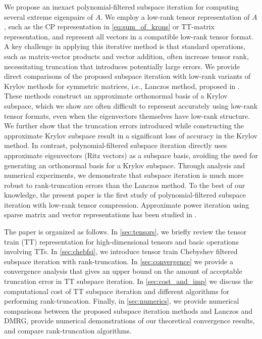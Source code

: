 \documentclass[10pt,preprint]{elsarticle}
\begin{document}
We propose an inexact polynomial-filtered subspace iteration for computing several extreme eigenpairs of $A$. We employ a low-rank tensor representation of $A$, such as the CP representation in \eqref{eq:sum_of_krons} or TT-matrix representation, and represent all vectors in a compatible low-rank tensor format. A key challenge in applying this iterative method is that standard operations, such as matrix-vector products and vector addition, often increase tensor rank, necessitating truncation that introduces potentially large errors. 
%
We provide direct comparisons of the proposed subspace iteration with low-rank variants of Krylov methods for symmetric matrices, i.e., Lanczos method, proposed in \cite{MPS_Lanczos,kressner2010krylov,kressner2011,Palitta2021}. These methods construct an approximate orthonormal basis of a Krylov subspace, which we show are often difficult to represent accurately using low-rank tensor formats, even when the eigenvectors themselves have low-rank structure. We further show that the truncation errors introduced while constructing the approximate Krylov subspace result in a significant loss of accuracy in the Krylov method. In contrast, polynomial-filtered subspace iteration directly uses approximate eigenvectors (Ritz vectors) as a subspace basis, avoiding the need for generating an orthonormal basis for a Krylov subspace. Through analysis and numerical experiments, we demonstrate that subspace iteration is much more robust to rank-truncation errors than the Lanczos method. To the best of our knowledge, the present paper is the first study of polynomial-filtered subspace iteration with low-rank tensor compression. Approximate power iteration using sparse matrix and vector representations has been studied in \cite{lu2020,yuan2013truncated}. 

The paper is organized as follows. In \cref{sec:tensors}, we briefly review the tensor train (TT) representation for high-dimensional tensors and basic operations involving TTs. 
In \cref{sec:chebfsi}, we introduce tensor train Chebyshev filtered subspace iteration with rank-truncation. In \cref{sec:convergence} we provide a convergence analysis that gives an upper bound on the amount of acceptable truncation error in TT subspace iteration. 
In \cref{sec:cost_and_imp} we discuss the computational cost of TT subspace iteration and different algorithms for performing rank-truncation. Finally, in \cref{sec:numerics}, we provide numerical comparisons between the proposed subspace iteration methods and Lanczos and DMRG, provide numerical demonstrations of our theoretical convergence results, and compare rank-truncation algorithms. 
\end{document}
